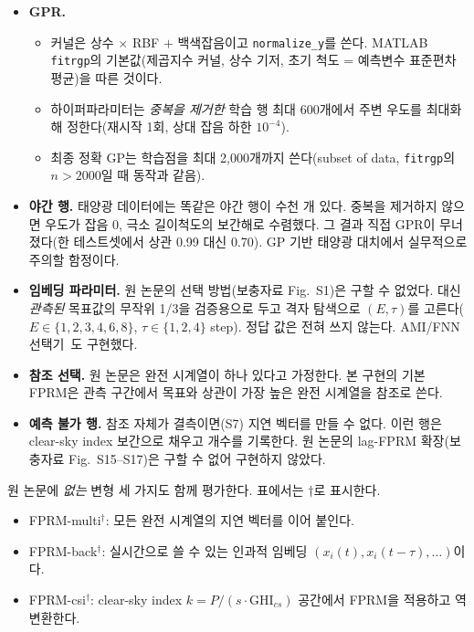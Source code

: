 \documentclass[11pt,a4paper]{article}
\begin{document}
\begin{itemize}
  \item \textbf{GPR.}
  \begin{itemize}
    \item 커널은 상수 $\times$ RBF $+$ 백색잡음이고 \texttt{normalize\_y}를 쓴다. MATLAB \texttt{fitrgp}의 기본값(제곱지수 커널, 상수 기저, 초기 척도 = 예측변수 표준편차 평균)을 따른 것이다.
    \item 하이퍼파라미터는 \emph{중복을 제거한} 학습 행 최대 600개에서 주변 우도를 최대화해 정한다(재시작 1회, 상대 잡음 하한 $10^{-4}$).
    \item 최종 정확 GP는 학습점을 최대 2{,}000개까지 쓴다(subset of data, \texttt{fitrgp}의 $n>2000$일 때 동작과 같음).
  \end{itemize}
  \item \textbf{야간 행.} 태양광 데이터에는 똑같은 야간 행이 수천 개 있다. 중복을 제거하지 않으면 우도가 잡음 0, 극소 길이척도의 보간해로 수렴했다. 그 결과 직접 GPR이 무너졌다(한 테스트셋에서 상관 0.99 대신 0.70). GP 기반 태양광 대치에서 실무적으로 주의할 함정이다.
  \item \textbf{임베딩 파라미터.} 원 논문의 선택 방법(보충자료 Fig.~S1)은 구할 수 없었다. 대신 \emph{관측된} 목표값의 무작위 1/3을 검증용으로 두고 격자 탐색으로 $(E,\tau)$를 고른다($E\in\{1,2,3,4,6,8\}$, $\tau\in\{1,2,4\}$ step). 정답 값은 전혀 쓰지 않는다. AMI/FNN 선택기~\cite{fraser1986,kennel1992}도 구현했다.
  \item \textbf{참조 선택.} 원 논문은 완전 시계열이 하나 있다고 가정한다. 본 구현의 기본 FPRM은 관측 구간에서 목표와 상관이 가장 높은 완전 시계열을 참조로 쓴다.
  \item \textbf{예측 불가 행.} 참조 자체가 결측이면(S7) 지연 벡터를 만들 수 없다. 이런 행은 clear-sky index 보간으로 채우고 개수를 기록한다. 원 논문의 lag-FPRM 확장(보충자료 Fig.~S15--S17)은 구할 수 없어 구현하지 않았다.
\end{itemize}

원 논문에 \emph{없는} 변형 세 가지도 함께 평가한다. 표에서는 $\dagger$로 표시한다.
\begin{itemize}
  \item FPRM-multi$^\dagger$: 모든 완전 시계열의 지연 벡터를 이어 붙인다.
  \item FPRM-back$^\dagger$: 실시간으로 쓸 수 있는 인과적 임베딩 $(x_i(t), x_i(t-\tau),\dots)$이다.
  \item FPRM-csi$^\dagger$: clear-sky index $k = P/(s\cdot\mathrm{GHI}_{cs})$ 공간에서 FPRM을 적용하고 역변환한다.
\end{itemize}
\end{document}
